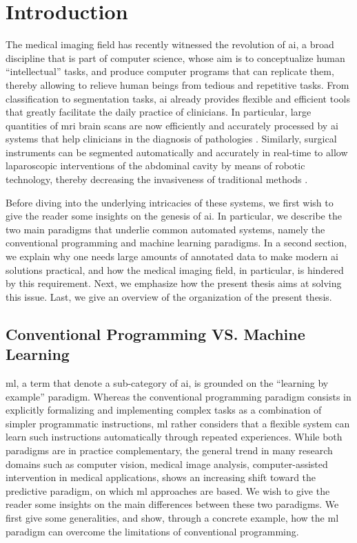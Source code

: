 \glsresetall

\chapter{Introduction}
\label{intro}

The medical imaging field has recently witnessed the revolution of \gls{ai}, a broad discipline that is part of computer science, whose aim is to conceptualize human ``intellectual'' tasks, and produce computer programs that can replicate them, thereby allowing to relieve human beings from tedious and repetitive tasks.
From classification to segmentation tasks, \gls{ai} already provides flexible and efficient tools that greatly facilitate the daily practice of clinicians.
In particular, large quantities of \gls{mri} brain scans are now efficiently and accurately processed by \gls{ai} systems that help clinicians in the diagnosis of pathologies \cite{sun19}.
Similarly, surgical instruments can be segmented automatically and accurately in real-time to allow laparoscopic interventions of the abdominal cavity by means of robotic technology, thereby decreasing the invasiveness of traditional methods \cite{davinci}.

Before diving into the underlying intricacies of these systems, we
first wish to give the reader some insights on the genesis of \gls{ai}.
In particular, we describe the two main paradigms that underlie common automated systems, namely the conventional programming and machine learning paradigms.
In a second section, we explain why one needs large amounts of annotated data to make modern \gls{ai} solutions practical, and how the medical imaging field, in particular, is hindered by this requirement.
Next, we emphasize how the present thesis aims at solving this issue.
Last, we give an overview of the organization of the present thesis.

\section{Conventional Programming VS. Machine Learning}
\Gls{ml}, a term that denote a sub-category of \gls{ai}, is grounded on the ``learning by example'' paradigm.
Whereas the conventional programming paradigm consists in explicitly formalizing and implementing complex tasks as a combination of simpler programmatic instructions,
\gls{ml} rather considers that a flexible system can learn such instructions automatically through repeated experiences.
While both paradigms are in practice complementary, the general trend in many research domains such as computer vision, medical image analysis, computer-assisted intervention in medical applications, shows an increasing shift toward the predictive paradigm, on which \gls{ml} approaches are based.
We wish to give the reader some insights on the main differences between these two paradigms.
We first give some generalities, and show, through a concrete example, how the \gls{ml} paradigm can overcome the limitations of conventional programming.

